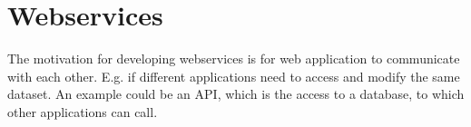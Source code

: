 \section{Webservices}
The motivation for developing webservices is for web application to communicate with each other. E.g. if different applications need to access and modify the same dataset. An example could be an API, which is the access to a database, to which other applications can call.